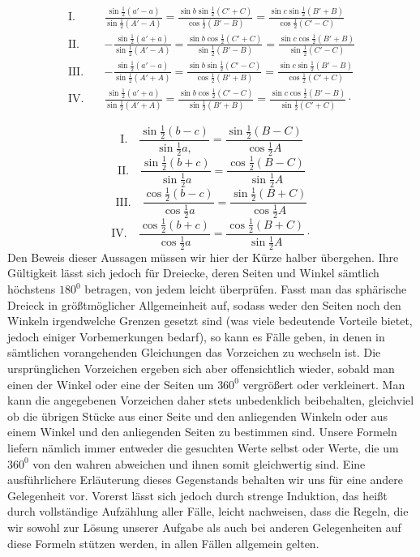 {\[
\begin{aligned}
\mathrm{I.}\quad&\frac{\sin\frac{1}{2}(a'-a)}{\sin\frac{1}{2}(A'-A)}=\frac{\sin b\sin\frac{1}{2}(C'+C)}{\cos\frac{1}{2}(B'-B)}=\frac{\sin c\sin\frac{1}{2}(B'+B)}{\cos\frac{1}{2}(C'-C)}\\[.5em]
\mathrm{II.}\quad&-\frac{\sin\frac{1}{2}(a'+a)}{\sin\frac{1}{2}(A'-A)}=\frac{\sin b\cos\frac{1}{2}(C'+C)}{\sin\frac{1}{2}(B'-B)}=\frac{\sin c\cos\frac{1}{2}(B'+B)}{\sin\frac{1}{2}(C'-C)}\\[.5em]
\mathrm{III.}\quad&-\frac{\sin\frac{1}{2}(a'-a)}{\sin\frac{1}{2}(A'+A)}=\frac{\sin b\sin\frac{1}{2}(C'-C)}{\cos\frac{1}{2}(B'+B)}=\frac{\sin c\sin\frac{1}{2}(B'-B)}{\cos\frac{1}{2}(C'+C)}\\[.5em]
\mathrm{IV.}\quad&\frac{\sin\frac{1}{2}(a'+a)}{\sin\frac{1}{2}(A'+A)}=\frac{\sin b\cos\frac{1}{2}(C'-C)}{\sin\frac{1}{2}(B'+B)}=\frac{\sin c\cos\frac{1}{2}(B'-B)}{\sin\frac{1}{2}(C'+C)}\cdot
\end{aligned}
\]
}
\par{}
\[
\mathrm{I.}\quad\frac{\sin\frac{1}{2}(b-c)}{\sin\frac{1}{2}a{,}}=\frac{\sin\frac{1}{2}(B-C)}{\cos\frac{1}{2}A}
\]
\[
\mathrm{II.}\quad\frac{\sin\frac{1}{2}(b+c)}{\sin\frac{1}{2}a}=\frac{\cos\frac{1}{2}(B-C)}{\sin\frac{1}{2}A}
\]
\[
\mathrm{III.}\quad\frac{\cos\frac{1}{2}(b-c)}{\cos\frac{1}{2}a}=\frac{\sin\frac{1}{2}(B+C)}{\cos\frac{1}{2}A}
\]
\[
\mathrm{IV.}\quad\frac{\cos\frac{1}{2}(b+c)}{\cos\frac{1}{2}a}=\frac{\cos\frac{1}{2}(B+C)}{\sin\frac{1}{2}A}\cdot
\]
Den Beweis dieser Aussagen müssen wir hier der Kürze halber übergehen. Ihre Gültigkeit lässt sich jedoch für Dreiecke, deren Seiten und Winkel sämtlich höchstens $180^0$ betragen, von jedem leicht überprüfen. Fasst man das sphärische Dreieck in größtmöglicher Allgemeinheit auf, sodass weder den Seiten noch den Winkeln irgendwelche Grenzen gesetzt sind (was viele bedeutende Vorteile bietet, jedoch einiger Vorbemerkungen bedarf), so kann es Fälle geben, in denen in sämtlichen vorangehenden Gleichungen das Vorzeichen zu wechseln ist. Die ursprünglichen Vorzeichen ergeben sich aber offensichtlich wieder, sobald man einen der Winkel oder eine der Seiten um $360^0$ vergrößert oder verkleinert. Man kann die angegebenen Vorzeichen daher stets unbedenklich beibehalten, gleichviel ob die übrigen Stücke aus einer Seite und den anliegenden Winkeln oder aus einem Winkel und den anliegenden Seiten zu bestimmen sind. Unsere Formeln liefern nämlich immer entweder die gesuchten Werte selbst oder Werte, die um $360^0$ von den wahren abweichen und ihnen somit gleichwertig sind. Eine ausführlichere Erläuterung dieses Gegenstands behalten wir uns für eine andere Gelegenheit vor. Vorerst lässt sich jedoch durch strenge Induktion, das heißt durch vollständige Aufzählung aller Fälle, leicht nachweisen, dass die Regeln, die wir sowohl zur Lösung unserer Aufgabe als auch bei anderen Gelegenheiten auf diese Formeln stützen werden, in allen Fällen allgemein gelten.
